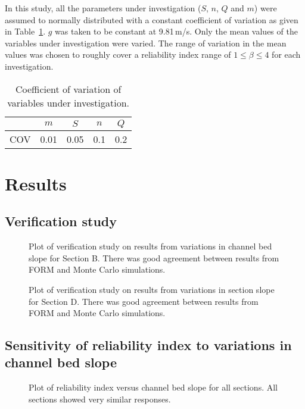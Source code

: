 \documentclass[a4paper]{article}
\begin{document}
In this study, all the parameters under investigation ($S$, $n$, $Q$ and $m$) 
were assumed to normally distributed with a constant coefficient of variation 
as given in Table~\ref{tab:cov}.
$g$ was taken to be constant at 9.81\,m/s.
Only the mean values of the variables under investigation were varied.
The range of variation in the mean values was chosen to roughly 
cover a reliability index range of $1 \leq \beta \leq 4$ for each investigation.

\begin{table}[htbp]
\centering
\begin{tabular}{lllll} \toprule
 & \multicolumn{1}{c}{$m$} & \multicolumn{1}{c}{$S$} & \multicolumn{1}{c}{$n$} & \multicolumn{1}{c}{$Q$}\\ \midrule
\multicolumn{1}{c}{COV} & \multicolumn{1}{r}{0.01} & \multicolumn{1}{r}{0.05} & \multicolumn{1}{r}{0.1} & \multicolumn{1}{r}{0.2} \\ \bottomrule
\end{tabular}
\caption{Coefficient of variation of variables under investigation.}
\label{tab:cov}
\end{table}



\section{Results}
\subsection{Verification study}
\begin{figure}[H]
\centering

\caption{Plot of verification study on results from variations in channel bed slope for Section B.
         There was good agreement between results from FORM and Monte Carlo simulations.}
\label{fig:verification_s}
\end{figure}

\begin{figure}[H]
\centering

\caption{Plot of verification study on results from variations in section slope for Section D.
         There was good agreement between results from FORM and Monte Carlo simulations.}
\label{fig:verification_m}
\end{figure}

\subsection{Sensitivity of reliability index to variations in channel bed slope}
\begin{figure}[H]
\centering

\caption{Plot of reliability index versus channel bed slope for all sections.
         All sections showed very similar responses.}
\label{fig:vary_s}
\end{figure}
\end{document}
